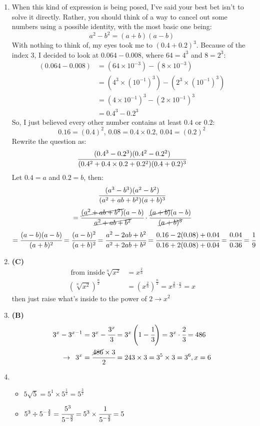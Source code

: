 \begin{multicols}{2}
\begin{enumerate}[label={\arabic*.}]
    \item When this kind of expression is being posed, I've said your best bet isn't to solve it directly. Rather, you should think of a way to cancel out some numbers using a possible identity, with the most basic one being:
    \[a^2 - b^2 = (a + b)(a - b)\]
    With nothing to think of, my eyes took me to \( (0.4 + 0.2)^3 \). Because of the index 3, I decided to look at \( 0.064 - 0.008 \), where \( 64 = 4^3 \) and \( 8 = 2^3 \):
    \begin{align*}
    (0.064 - 0.008) &= (64 \times 10^{-3}) - (8 \times 10^{-3}) \\
    &= (4^3 \times (10^{-1})^3) - (2^3 \times (10^{-1})^3) \\
    &= (4 \times 10^{-1})^3 - (2 \times 10^{-1})^3 \\
    &= 0.4^3 - 0.2^3
    \end{align*}
    So, I just believed every other number contains at least \( 0.4 \) or \( 0.2 \):
    \[0.16 = (0.4)^2, \, 0.08 = 0.4 \times 0.2, \, 0.04 = (0.2)^2\]
    Rewrite the question as:
    \[\cfrac{(0.4^3 - 0.2^3)(0.4^2 - 0.2^2)}{(0.4^2 + 0.4 \times 0.2 + 0.2^2)(0.4 + 0.2)^3}\]
    Let \( 0.4 = a \) and \( 0.2 = b \), then:
    \[\cfrac{(a^3 - b^3)(a^2 - b^2)}{(a^2 + ab + b^2)(a + b)^3}\]
    \[= \cfrac{\cancel{(a^2 + ab + b^2)}(a - b)}{\cancel{a^2 + ab + b^2}} \cdot \cfrac{\cancel{(a + b)}(a - b)}{\cancel{(a + b)^3}} \]
    \[ = \cfrac{(a - b)(a - b)}{(a + b)^2} = \cfrac{(a - b)^2}{(a + b)^2} = \cfrac{a^2 - 2ab + b^2}{a^2 + 2ab + b^2} = \cfrac{0.16 - 2(0.08) + 0.04}{0.16 + 2(0.08) + 0.04} = \cfrac{0.04}{0.36} = \cfrac{1}{9}\]  

    \item \textbf{(C)}
    \begin{align*} 
    \text{ from inside}  \sqrt[n]{x^2} &= x^{\frac{2}{n}} \\
    (\sqrt[n]{x^2})^{\frac{n}{2}} & = (x^{\frac{2}{n}})^{\frac{n}{2}} = x^{\frac{2}{n} \cdot \frac{n}{2}} = x 
    \end{align*}
    then just raise what's inside to the power of $2 \rightarrow x^2$
    \item \textbf{(B)} \begin{align*} 
        3^x - 3^{x-1} &= 3^x -\cfrac{3^x}{3} = 3^x\left(1- \cfrac{1}{3}\right) =3^x \cdot \cfrac{2}{3} =  486 \\ \rightarrow \hspace{5pt}  3^x &=  \cfrac{\cancel{486}\times 3}{2} = 243 \times 3 = 3^5 \times 3 = 3^6, x = 6
    \end{align*}
    \item
    \begin{itemize} 
    \item $5\sqrt{5} = 5^1 \times 5^{\frac{1}{2}} = 5^{\frac{3}{2}}$
    \item $5^3 \divisionsymbol 5^{-\frac{3}{2}} = \cfrac{5^3}{5^{-\frac{3}{2}}} = 5^3 \times \cfrac{1}{5^{-\frac{3}{2}}} = 5$
    \end{itemize}


\end{enumerate}
\end{multicols}
